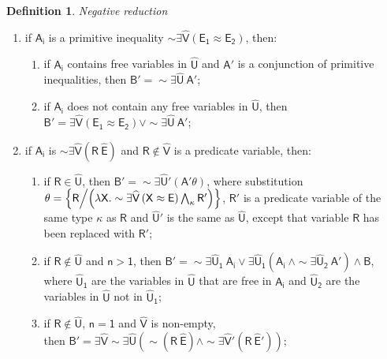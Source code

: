 \documentclass[inscr,ack,preface]{dithesis}
\theoremstyle{definition}
\newtheorem{definition}{Definition}[]
\newcommand{\msf}[1]{$\mathsf{#1}$}
\begin{document}
\begin{definition}{\emph{Negative reduction}}
\begin{enumerate}
        then \msf{B' = \sim \exists \widehat{U} \left( A_1 \land \dots \land A_i' \land \dots \land A_n \right)};
  \item if \msf{A_i} is a primitive inequality \msf{\sim \exists \widehat{V} \left( E_1 \approx E_2 \right)}, then:
        \begin{enumerate}
          \item if \msf{A_i} contains free variables in \msf{\widehat{U}} and \msf{A'} is a conjunction of primitive inequalities, then \msf{B' = \sim \exists \widehat{U} ~ A'};
          \item if \msf{A_i} does not contain any free variables in \msf{\widehat{U}}, then \msf{B' = \exists \widehat{V} \left( E_1 \approx E_2 \right) \lor \sim \exists \widehat{U} ~ A'};
        \end{enumerate}
  \item if \msf{A_i} is \msf{\sim \exists \widehat{V} \left( R ~ \widehat{E} \right)} and \msf{R \not\in \widehat{V}} is a predicate variable,
        then:
        \begin{enumerate}
          \item if \msf{R \in \widehat{U}},
                then \msf{B' = \sim \exists \widehat{U}' \left( A' \theta \right)},
                where substitution \\ \msf{\theta = \left\{ R \middle/ \left( \lambda X . \sim \exists \widehat{V} \left( X \approx E \right) \bigwedge_{\kappa} R' \right) \right\}},
                \msf{R'} is a predicate variable of the same type \msf{\kappa} as \msf{R}
                and \msf{\widehat{U}'} is the same as \msf{\widehat{U}}, except that variable \msf{R} has been replaced with \msf{R'};
          \item if \msf{R \not\in \widehat{U}} and \msf{n > 1},
                then \msf{B' = \sim \exists \widehat{U}_1 ~ A_i \lor \exists \widehat{U}_1 \left( A_i ~ \land \sim \exists \widehat{U}_2 ~ A' \right) \land B},
                where \msf{\widehat{U}_1} are the variables in \msf{\widehat{U}} that are free in \msf{A_i} and \msf{\widehat{U}_2} are the variables in \msf{\widehat{U}} not in \msf{\widehat{U}_1};
          \item if \msf{R \not\in \widehat{U}}, \msf{n = 1} and \msf{\widehat{V}} is non-empty, \\
                then \msf{B' = \exists \widehat{V} \sim \exists \widehat{U} \left( \sim \left( R ~ \widehat{E} \right) \land \sim \exists \widehat{V}' \left( R ~ \widehat{E}' \right) \right)};
        \end{enumerate}

\end{enumerate}
\end{definition}
\end{document}
